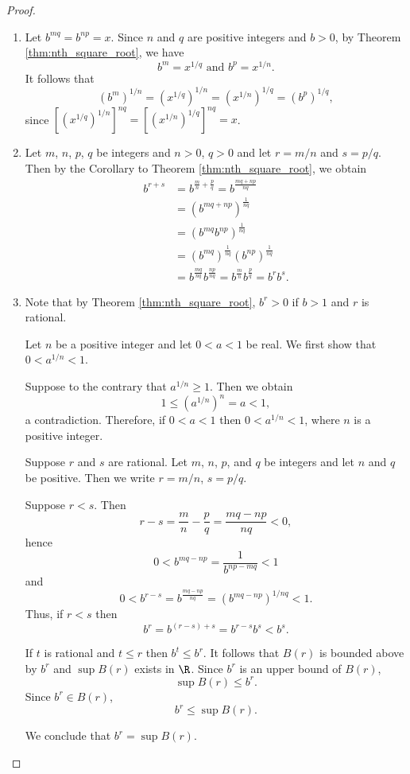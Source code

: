 \begin{proof}
\,
\begin{enumerate}
\item[(a)]
Let $b^{mq}=b^{np}=x$.
Since $n$ and $q$ are positive integers and $b>0$, by Theorem \ref{thm:nth_square_root}, we have 
\[
b^m=x^{1/q} \text{ and } b^p=x^{1/n}.
\]
It follows that
\[
(b^m)^{1/n}=(x^{1/q})^{1/n}=(x^{1/n})^{1/q}=(b^p)^{1/q},
\]
since $[(x^{1/q})^{1/n}]^{nq}=[(x^{1/n})^{1/q}]^{nq}=x$.
\item[(b)]Let $m$, $n$, $p$, $q$ be integers and $n>0$, $q>0$ and let $r=m/n$ and $s=p/q$. 
Then by the Corollary to Theorem \ref{thm:nth_square_root}, we obtain
\begin{align*}
b^{r+s}
&=b^{\frac{m}{n}+\frac{p}{q}}
=b^{\frac{mq+np}{nq}}\\
&=\left(b^{mq+np}\right)^{\frac{1}{nq}}\\
&=\left(b^{mq}b^{np}\right)^{\frac{1}{nq}}\\
&=\left(b^{mq}\right)^{\frac{1}{nq}} \left(b^{np}\right)^{\frac{1}{nq}}\\
&=b^{\frac{mq}{nq}} b^{\frac{np}{nq}}
=b^{\frac{m}{n}} b^{\frac{p}{q}}
=b^rb^s.
\end{align*}
\item[(c)]
Note that by Theorem \ref{thm:nth_square_root}, $b^r>0$ if $b>1$ and $r$ is rational.

Let $n$ be a positive integer and let $0<a<1$ be real. We first show that $0<a^{1/n}<1$.

Suppose to the contrary that $a^{1/n} \geq 1$. Then we obtain 
\[
1 \leq \left(a^{1/n}\right)^n=a<1,
\]
a contradiction. Therefore, if $0<a<1$ then $0<a^{1/n}<1$, where $n$ is a positive integer.

Suppose $r$ and $s$ are rational. 
Let $m$, $n$, $p$, and $q$ be integers and let $n$ and $q$ be positive.
Then we write $r=m/n$, $s=p/q$.

Suppose $r<s$. Then
\[
r-s =\frac{m}{n}-\frac{p}{q} =\frac{mq-np}{nq} <0,
\]
hence
\[
0 < b^{mq-np} = \frac{1}{b^{np-mq}} < 1
\]
and 
\[
0 < b^{r-s} = b^{\frac{mq-np}{nq}} = \left(b^{mq-np}\right)^{1/nq} < 1.
\]
Thus, if $r<s$ then
\[
b^r = b^{(r-s)+s} = b^{r-s}b^s < b^s.
\]

If $t$ is rational and $t \leq r$ then $b^t \leq b^r$. 
It follows that $B(r)$ is bounded above by $b^r$ and $\sup B(r)$ exists in $\R$.
Since $b^r$ is an upper bound of $B(r)$, 
\[
\sup B(r) \leq b^r.
\]
Since $b^r \in B(r)$,
\[
b^r \leq \sup B(r).
\]

We conclude that $b^r = \sup B(r)$.


\end{enumerate}
\end{proof}
